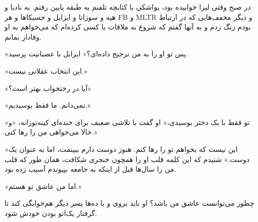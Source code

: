 در صبح وقتی لیزا خوابیده بود، یواشکی با کتابچه تلفنم به طبقه پایین رفتم. به نادیا و هیه و سوزانا و ایزابل و جسیکاها و هر FB و MLTR و دیگر مخفف‌هایی که در ارتباط بودم زنگ زدم و به آنها گفتم که شروع به ملاقات با کسی کرده‌ام که می‌خواهم به او وفادار بمانم.

«پس تو او را به من ترجیح داده‌ای؟» ایزابل با عصبانیت پرسید.

«این انتخاب عقلانی نیست.»

«آیا در رختخواب بهتر است؟»

«نمی‌دانم. ما فقط بوسیدیم.»

«تو فقط با یک دختر بوسیدی،» او گفت با تلاشی ضعیف برای خنده‌ای کینه‌توزانه، «و حالا می‌خواهی من را رها کنی.»

«این نیست که بخواهم تو را رها کنم. هنوز دوست دارم ببینمت، اما به عنوان یک دوست.» شنیدم که این کلمه قلب او را همچون خنجری شکافت، همان طور که قلب من را سال‌ها قبل از اینکه به جامعه بپیوندم آسیب زده بود.

«اما من عاشق تو هستم.»

چطور می‌توانست عاشق من باشد؟ او باید بروی و با ده‌ها پسر دیگر هم‌خوابگی کند تا گرفتار یک‌اتو بودن خودش شود.